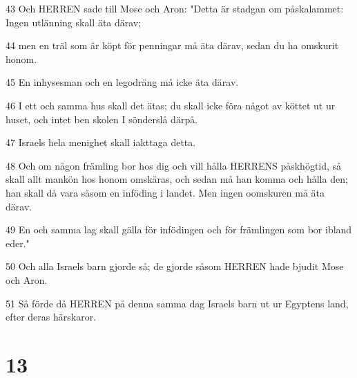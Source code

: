 \par 43 Och HERREN sade till Mose och Aron: "Detta är stadgan om påskalammet: Ingen utlänning skall äta därav;
\par 44 men en träl som är köpt för penningar må äta därav, sedan du ha omskurit honom.
\par 45 En inhysesman och en legodräng må icke äta därav.
\par 46 I ett och samma hus skall det ätas; du skall icke föra något av köttet ut ur huset, och intet ben skolen I sönderslå därpå.
\par 47 Israels hela menighet skall iakttaga detta.
\par 48 Och om någon främling bor hos dig och vill hålla HERRENS påskhögtid, så skall allt mankön hos honom omskäras, och sedan må han komma och hålla den; han skall då vara såsom en inföding i landet. Men ingen oomskuren må äta därav.
\par 49 En och samma lag skall gälla för infödingen och för främlingen som bor ibland eder."
\par 50 Och alla Israels barn gjorde så; de gjorde såsom HERREN hade bjudit Mose och Aron.
\par 51 Så förde då HERREN på denna samma dag Israels barn ut ur Egyptens land, efter deras härskaror.

\chapter{13}

